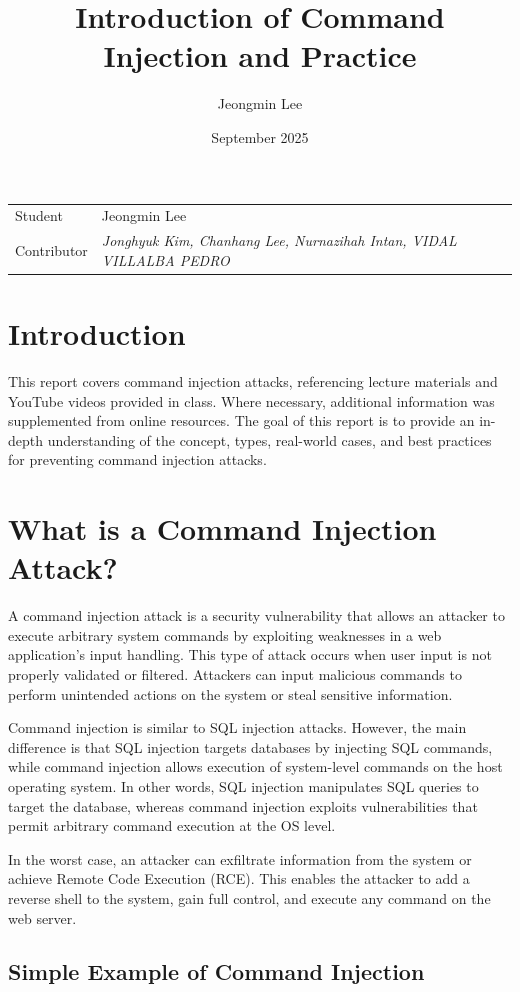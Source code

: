 \documentclass{article}
\title{Introduction of Command Injection and Practice}
\author{Jeongmin Lee}
\date{September 2025}
\begin{document}
\maketitle

\noindent\begin{tabular}{@{}ll}
  Student & Jeongmin Lee\\
  Contributor & \textit{Jonghyuk Kim, Chanhang Lee, Nurnazihah Intan, VIDAL VILLALBA PEDRO}\\
\end{tabular}

\section*{Introduction}
This report covers command injection attacks, referencing lecture materials and YouTube videos provided in class. Where necessary, additional information was supplemented from online resources. The goal of this report is to provide an in-depth understanding of the concept, types, real-world cases, and best practices for preventing command injection attacks.

\section*{What is a Command Injection Attack?}
A command injection attack is a security vulnerability that allows an attacker to execute arbitrary system commands by exploiting weaknesses in a web application's input handling.
This type of attack occurs when user input is not properly validated or filtered.
Attackers can input malicious commands to perform unintended actions on the system or steal sensitive information.

Command injection is similar to SQL injection attacks. However, the main difference is that SQL injection targets databases by injecting SQL commands, while command injection allows execution of system-level commands on the host operating system.
In other words, SQL injection manipulates SQL queries to target the database, whereas command injection exploits vulnerabilities that permit arbitrary command execution at the OS level.

In the worst case, an attacker can exfiltrate information from the system or achieve Remote Code Execution (RCE).
This enables the attacker to add a reverse shell to the system, gain full control, and execute any command on the web server.

\subsection*{Simple Example of Command Injection}
\end{document}

